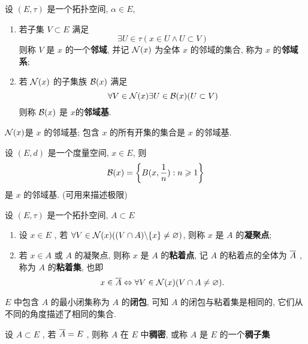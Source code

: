  \begin{Def}[邻域基]\label{def:邻域基}
       设 $ (E, \tau) $ 是一个拓扑空间, $ \alpha\in E $, 
       \begin{enumerate}[(1)]
            \item 若子集 $ V\subset E $ 满足
            \[
                 \exists U\in \tau(x\in U\wedge U\subset V)
            \]
            则称 $ V $ 是 $ x $ 的一个\textbf{邻域}, 并记 $ \CN{x} $ 为全体 $ x $ 的邻域的集合, 称为 $ x $ 的\textbf{邻域系};
            \item 若 $ \CN{x} $ 的子集族 $ \CB{x} $ 满足
            \[
                 \forall V\in \CN{x}\exists U\in \CB{x}(U\subset V)
            \]  
            则称 $ \CB{x} $ 是 $ x $的\textbf{邻域基}. 
       \end{enumerate}
 \end{Def}
 \begin{Rmk}
      $ \CN{x} $是 $ x $  的邻域基; 包含 $ x $ 的所有开集的集合是 $ x $ 的邻域基. 
 \end{Rmk}
 \begin{Ex}
      设 $ (E, d) $ 是一个度量空间, $ x\in E $, 则 
      \[
          \CB{x}=\left\{ B(x,\frac{1}{n}): n\geqslant 1 \right\} 
      \]
      是 $ x $ 的邻域基. (可用来描述极限)
 \end{Ex}
 \begin{Def}[粘着集]
     设 $ (E, \tau) $ 是一个拓扑空间, $ A\subset E $ 
     \begin{enumerate}[(1)]
          \item 设 $ x\in E $ , 若 $ \forall V\in \CN{x}((V\cap A)\bs \{ x \}\neq\varnothing) $, 则称 $ x $ 是 $ A $ 的\textbf{凝聚点};
          \item 若 $ x\in A $ 或 $ A $  的凝聚点, 则称 $ x $ 是 $ A $ 的\textbf{粘着点}, 记 $ A $ 的粘着点的全体为 $ \baro{A} $ , 称为 $ A $ 的\textbf{粘着集}, 也即
          \[
               x\in \baro{A}\Leftrightarrow \forall V\in \CN{x}(V\cap A\neq\varnothing).    
          \]
     \end{enumerate}
 \end{Def}
 \begin{Rmk}
      $ E $ 中包含 $ A $ 的最小闭集称为 $ A $ 的\textbf{闭包}, 可知 $ A $ 的闭包与粘着集是相同的, 它们从不同的角度描述了相同的集合. 
 \end{Rmk}
 \begin{Def}[稠密]\label{def:稠密}
       设 $ A\subset E $ , 若 $ \baro{A}=E $ , 则称 $ A $ 在 $ E $ 中\textbf{稠密}, 或称 $ A $ 是 $ E $ 的一个\textbf{稠子集}
 \end{Def}
